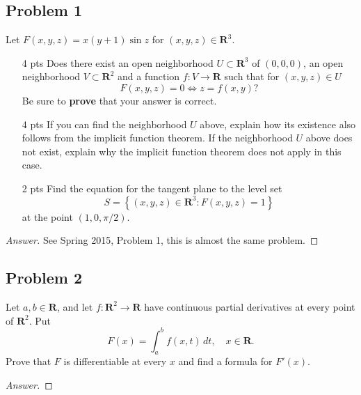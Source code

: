 \documentclass[12pt]{article}
\newcommand\setb[1]{\left \{ #1 \right \}}
\theoremstyle{definition}
\begin{document}
\subsection{Problem 1}
Let $F(x,y,z) = x(y+1) \sin z$ for $(x,y,z) \in \mathbf{R}^3$. 
\begin{enumerate}[a.]
    \item [4 pts] Does there exist an open neighborhood $U \subset \mathbf{R}^3$ of $(0,0,0)$, an open neighborhood $V \subset \mathbf{R}^2$ and a function $f : V \to \mathbf{R}$ such that for $(x,y,z) \in U$
    \[
        F(x,y,z) = 0 \iff z = f(x,y)?
    \]
    Be sure to \textbf{prove} that your answer is correct. 
    \item [4 pts] If you can find the neighborhood $U$ above, explain how its existence also follows from the implicit function theorem. If the neighborhood $U$ above does not exist, explain why the implicit function theorem does not apply in this case.
    \item [2 pts] Find the equation for the tangent plane to the level set 
    \[
        S = \setb{ (x,y,z) \in \mathbf{R}^3 : F(x,y,z) = 1 }
    \]
    at the point $(1,0,\pi/2)$.
\end{enumerate}
\begin{proof}[Answer]
    See Spring 2015, Problem 1, this is almost the same problem. 
\end{proof}

\subsection{Problem 2}
Let $a, b \in \mathbf{R}$, and let $f : \mathbf{R}^2 \to \mathbf{R}$ have continuous partial derivatives at every point of $\mathbf{R}^2$. Put 
\[
    F(x) = \int_a^b f(x,t) \, dt , \quad x \in \mathbf{R} . 
\]
Prove that $F$ is differentiable at every $x$ and find a formula for $F'(x)$. 
\begin{proof}[Answer]
    
\end{proof}
\end{document}
